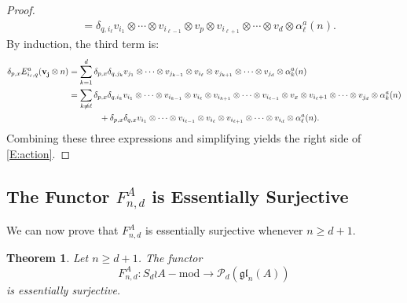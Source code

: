 \documentclass[11pt,reqno]{amsart} %
\newtheorem{theorem}{Theorem}[subsection]
\newcommand{\gl}{\mathfrak{gl}}
\newcommand{\0}{\bar{0}}
\newcommand{\1}{\bar{1}}
\newcommand{\wreath}{\wr}
\newcommand{\bv}{\mathbf{v}}
\newcommand{\bj}{\mathbf{j}}
\newcommand{\Pol}{\mathcal{P}}
\numberwithin{equation}{subsection}
\begin{document}
\begin{proof}
\begin{align*}
&=  \delta_{q, i_{\ell}} v_{i_{1}} \otimes \dotsb \otimes v_{i_{\ell-1}} \otimes v_{p} \otimes v_{i_{\ell+1}} \otimes \dotsb \otimes v_{d} \otimes \alpha^{a}_{\ell}(n).
\end{align*} By induction, the third term is:
\begin{align*}
\delta_{p,x}E^{a}_{i_{\ell},q}(\bv^{}_{\bj}\otimes n) &=  \sum_{k=1}^{d} \delta_{p, x}\delta_{q,j_{k}} v_{j_{1}} \otimes \dotsb  \otimes v_{j_{k-1}}\otimes v_{i_{\ell}} \otimes v_{j_{k+1}}\otimes  \dotsb \otimes v_{j_{d}}  \otimes \alpha_{k}^{a}(n) \\
&=\sum_{k\neq \ell}\delta_{p, x}\delta_{q, i_{k}} v_{i_{1}} \otimes \dotsb \otimes v_{i_{k-1}}\otimes  v_{i_{\ell}}\otimes v_{i_{k+1}} \otimes \dotsb \otimes v_{i_{\ell-1}} \otimes v_{x} \otimes v_{i_{\ell}+1}\otimes \dotsb \otimes  v_{j_{d}}  \otimes \alpha_{k}^{a}(n) \\
& \hspace{0.5in} + \delta_{p, x}\delta_{q,x} v_{i_{1}}\otimes \dotsb \otimes v_{i_{\ell-1}}\otimes v_{i_{\ell}}\otimes v_{i_{\ell+1}} \otimes \dotsb \otimes v_{i_{d}} \otimes  \alpha^{a}_{\ell}(n).
\end{align*}
Combining these three expressions and simplifying yields the right side of \eqref{E:action}.
\end{proof}

\subsection{The Functor $F^{A}_{n,d}$ is Essentially Surjective}\label{SS:Essential-surjectivity}

We can now prove that $F^{A}_{n,d}$ is essentially surjective whenever $n \geq d+1$.

\begin{theorem}\label{T:essentially-surjective}  Let $n \geq d+1$.  The functor 
\[
F^{A}_{n,d}: S_{d}\wreath A-\textrm{mod} \to \Pol_{d}(\gl_{n}(A))
\] is essentially surjective.
\end{theorem}
\end{document}
